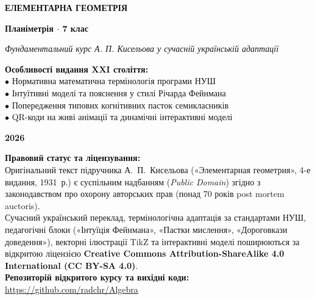 \documentclass[11pt,a4paper,oneside]{book}
\begin{document}
\begin{titlepage}
    \centering
    \vspace*{1.5cm}
    
    {\Huge\bfseries\color{primaryblue} ЕЛЕМЕНТАРНА ГЕОМЕТРІЯ\par}
    \vspace{0.4cm}
    {\Large\bfseries Планіметрія $\cdot$ 7 клас\par}
    
    \vspace{1.5cm}
    {\large\itshape Фундаментальний курс А. П. Кисельова у сучасній українській адаптації\par}
    
    \vspace{2.5cm}
    
    \begin{tcolorbox}[colback=boxbglight, colframe=primaryblue, width=0.85\textwidth, arc=2mm]
    \centering
    \textbf{Особливості видання XXI століття:}\\
    \small
    $\bullet$ Нормативна математична термінологія програми НУШ\\
    $\bullet$ Інтуїтивні моделі та пояснення у стилі Річарда Фейнмана\\
    $\bullet$ Попередження типових когнітивних пасток семикласників\\
    $\bullet$ QR-коди на живі анімації та динамічні інтерактивні моделі
    \end{tcolorbox}
    
    \vfill
    
    {\large\bfseries 2026}\par
\end{titlepage}

\thispagestyle{empty}
\vspace*{11cm}
\begin{flushleft}
\small
\textbf{Правовий статус та ліцензування:}\\
Оригінальний текст підручника А.~П.~Кисельова («Элементарная геометрия», 4-е видання, 1931~р.) є суспільним надбанням (\textit{Public Domain}) згідно з законодавством про охорону авторських прав (понад 70 років post mortem auctoris).\\
\vspace{0.25cm}
Сучасний український переклад, термінологічна адаптація за стандартами НУШ, педагогічні блоки («Інтуїція Фейнмана», «Пастки мислення», «Дороговкази доведення»), векторні ілюстрації TikZ та інтерактивні моделі поширюються за відкритою ліцензією \textbf{Creative Commons Attribution-ShareAlike 4.0 International (CC BY-SA 4.0)}.\\
\vspace{0.25cm}
\textbf{Репозиторій відкритого курсу та вихідні коди:} \\
\url{https://github.com/radchr/Algebra}
\end{flushleft}
\newpage

\tableofcontents
\newpage




\end{document}
